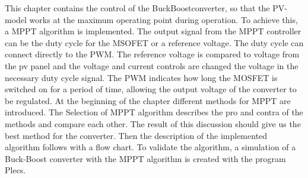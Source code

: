 This chapter contains the control of the BuckBoostconverter, so that the PV-model works at the maximum operating point during operation. To achieve this, a MPPT algorithm is implemented. The output signal from the MPPT controller can be the duty cycle for the MSOFET or a reference voltage. The duty cycle can connect directly to the PWM. The reference voltage is compared to voltage from the pv panel and the voltage and current controls are changed the voltage in the necessary duty cycle signal. The PWM indicates how long the MOSFET is switched on for a period of time, allowing the output voltage of the converter to be regulated. At the beginning of the chapter different methods for MPPT are introduced. The Selection of MPPT algorithm describes the pro and contra of the methods and compare each other. The result of this discussion should give us the best method for the converter. Then the description of the implemented algorithm follows with a flow chart. To validate the algorithm, a simulation of a Buck-Boost converter with the MPPT algorithm is created with the program Plecs.
